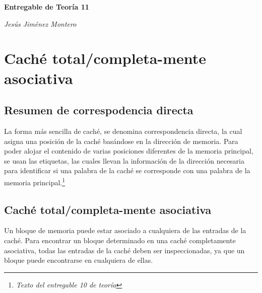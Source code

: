 \documentclass[12pt]{article}
\begin{document}
\nocite{namesans_about}
\nocite{namesans}
\nocite{namemono}


	\begin{titlepage}
		\begin{center}
			{\Huge \textbf{Entregable de Teoría 11}}

			\vspace{2cm}

			{\Large \textit{Jesús Jiménez Montero}}

			\vspace{2cm}
		\end{center}
	\end{titlepage}

	\newpage
	\renewcommand{\contentsname}{Tabla de contenidos}
	\setcounter{secnumdepth}{5}
	\tableofcontents
	\setcounter{tocdepth}{4}
	\newpage


\section{Caché total/completa-mente asociativa}

	\subsection{Resumen de correspodencia directa}

		La forma más sencilla de caché, se denomina correspondencia directa,
		la cual asigna una posición de la caché basándose en la dirección de
		memoria.
		Para poder alojar el contenido de varias posiciones diferentes de
		la memoria principal, se usan las etiquetas, las cuales llevan la información
		de la dirección necesaria para identificar si una palabra de la
		caché se corresponde con una palabra de la memoria principal.\footnote{\textit{Texto del entregable 10 de teoría}}

	\subsection{Caché total/completa-mente asociativa}

		Un bloque de memoria puede estar asociado a cualquiera de las entradas de la caché. Para encontrar un bloque determinado en una caché completamente asociativa, todas las entradas de la caché deben ser inspeccionadas, ya que un bloque puede encontrarse en cualquiera de ellas.
\end{document}
